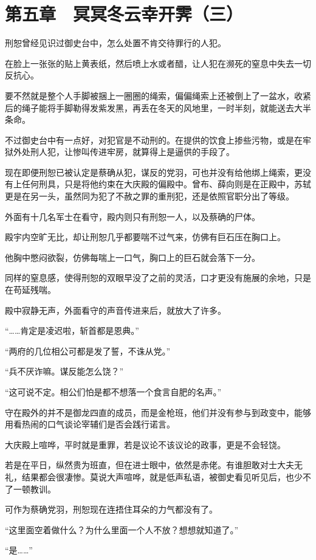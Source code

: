 \section{第五章　冥冥冬云幸开霁（三）}

刑恕曾经见识过御史台中，怎么处置不肯交待罪行的人犯。

在脸上一张张的贴上黄表纸，然后喷上水或者醋，让人犯在濒死的窒息中失去一切反抗心。

要不然就是整个人手脚被捆上一圈圈的绳索，偏偏绳索上还被倒上了一盆水，收紧后的绳子能将手脚勒得发紫发黑，再丢在冬天的风地里，一时半刻，就能送去大半条命。

不过御史台中有一点好，对犯官是不动刑的。在提供的饮食上掺些污物，或是在牢狱外处刑人犯，让惨叫传进牢房，就算得上是逼供的手段了。

现在即便刑恕已被认定是蔡确从犯，谋反的党羽，可也并没有给他绑上绳索，更没有上任何刑具，只是将他约束在大庆殿的偏殿中。曾布、薛向则是在正殿中，苏轼更是在另一头，虽然同为犯了不赦之罪的重刑犯，还是依照官职分出了等级。

外面有十几名军士在看守，殿内则只有刑恕一人，以及蔡确的尸体。

殿宇内空旷无比，却让刑恕几乎都要喘不过气来，仿佛有巨石压在胸口上。

他胸中憋闷欲裂，仿佛每喘上一口气，胸口上的巨石就会落下一分。

同样的窒息感，使得刑恕的双眼早没了之前的灵活，口才更没有施展的余地，只是在苟延残喘。

殿中寂静无声，外面看守的声音传进来后，就放大了许多。

“……肯定是凌迟啦，斩首都是恩典。”

“两府的几位相公可都是发了誓，不诛从党。”

“兵不厌诈嘛。谋反能怎么饶？”

“这可说不定。相公们怕是都不想落一个食言自肥的名声。”

守在殿外的并不是御龙四直的成员，而是金枪班，他们并没有参与到政变中，能够用看热闹的口气谈论宰辅们是否会践行诺言。

大庆殿上喧哗，平时就是重罪，若是议论不该议论的政事，更是不会轻饶。

若是在平日，纵然贵为班直，但在进士眼中，依然是赤佬。有谁胆敢对士大夫无礼，结果都会很凄惨。莫说大声喧哗，就是低声私语，被御史看见听见后，也少不了一顿教训。

可作为蔡确党羽，刑恕现在连捂住耳朵的力气都没有了。

“这里面空着做什么？为什么里面一个人不放？想想就知道了。”

“是……”

